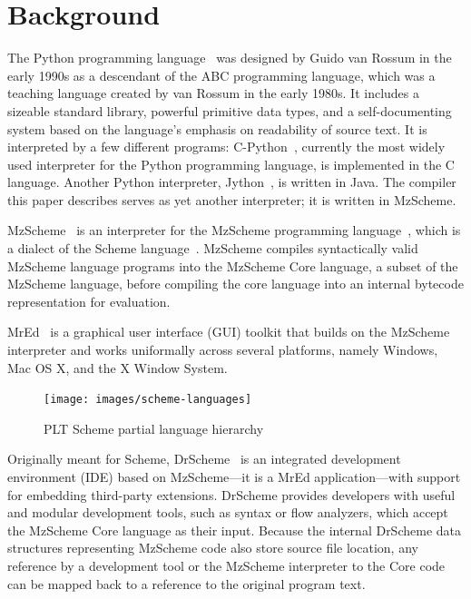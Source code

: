 \section{Background}
\label{background}

The Python programming language~\cite{pythonlang} was designed by Guido van Rossum in the early 1990s as a descendant of the ABC programming language, which was a teaching language created by van Rossum in the early 1980s.  It includes a sizeable standard library, powerful primitive data types, and a self-documenting system based on the language's emphasis on readability of source text.  It is interpreted by a few different programs: C-Python~\cite{python}, currently the most widely used interpreter for the Python programming language, is implemented in the C language.  Another Python interpreter, Jython~\cite{jython}, is written in Java.  The compiler this paper describes serves as yet another interpreter; it is written in MzScheme.

MzScheme~\cite{mzscheme} is an interpreter for the MzScheme programming language~\cite{mzschemelang}, which is a dialect of the Scheme language~\cite{kelsey98revised}.  MzScheme compiles syntactically valid MzScheme language programs into the MzScheme Core language, a subset of the MzScheme language, before compiling the core language into an internal bytecode representation for evaluation.

MrEd~\cite{mred} is a graphical user interface (GUI) toolkit that builds on the MzScheme interpreter and works uniformally across several platforms, namely Windows, Mac OS X, and the X Window System.

\begin{figure}
	\caption{PLT Scheme partial language hierarchy}
	\label{schemelanguagesfig}
	\begin{center}
		\texttt{[image: images/scheme-languages]}
	\end{center}
\end{figure}


Originally meant for Scheme, DrScheme~\cite{bruce97drscheme} is an integrated development environment (IDE) based on MzScheme---it is a MrEd application---with support for embedding third-party extensions.  DrScheme provides developers with useful and modular development tools, such as syntax or flow analyzers, which accept the MzScheme Core language as their input.  Because the internal DrScheme data structures representing MzScheme code also store source file location, any reference by a development tool or the MzScheme interpreter to the Core code can be mapped back to a reference to the original program text.

